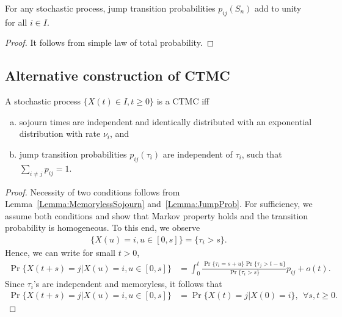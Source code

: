 \documentclass[a4paper,10pt,english]{article}
\begin{document}
\begin{lem}\label{Lemma:JumpProb}
For any stochastic process, jump transition probabilities $p_{ij}(S_n)$ add to unity for all $i \in I$.
\end{lem}
\begin{proof}
It follows from simple law of total probability.
\end{proof}
\subsection{Alternative construction of CTMC}
\begin{prop} A stochastic process $\{X(t) \in I, t \geqslant 0 \}$ is a CTMC iff 
\begin{enumerate}[a.]
\item sojourn times are independent and identically distributed with an exponential distribution with rate $\nu_i$, and 
\item jump transition probabilities $p_{ij}(\tau_i)$ are independent of $\tau_i$, such that $\sum_{i \neq j}p_{ij}=1$.
\end{enumerate}
\end{prop}
\begin{proof}
Necessity of two conditions follows from Lemma~\ref{Lemma:MemorylessSojourn} and~\ref{Lemma:JumpProb}. 
For sufficiency, we assume both conditions and show that Markov property holds and the transition probability is homogeneous. 
To this end, we observe
\begin{align*}
\{ X(u) = i, u \in [0,s] \} = \{ \tau_i > s \}.
\end{align*}
Hence, we can write for small $t > 0$, 
\begin{align*}
\Pr\{ X(t+s) = j | X(u) = i, u \in [0,s] \} 
&= \int_0^{t}\frac{\Pr\{\tau_i = s+u\}\Pr\{\tau_j > t-u\}}{\Pr\{\tau_i > s\}}p_{ij} + o(t).
\end{align*}
Since $\tau_i$'s are independent and memoryless, it follows that
\begin{align*}
\Pr\{ X(t+s) = j | X(u) = i, u \in [0,s] \} 
&= \Pr\{X(t) = j | X(0) = i\}, ~~\forall s, t \geqslant 0.
\end{align*}
\end{proof}
\end{document}
